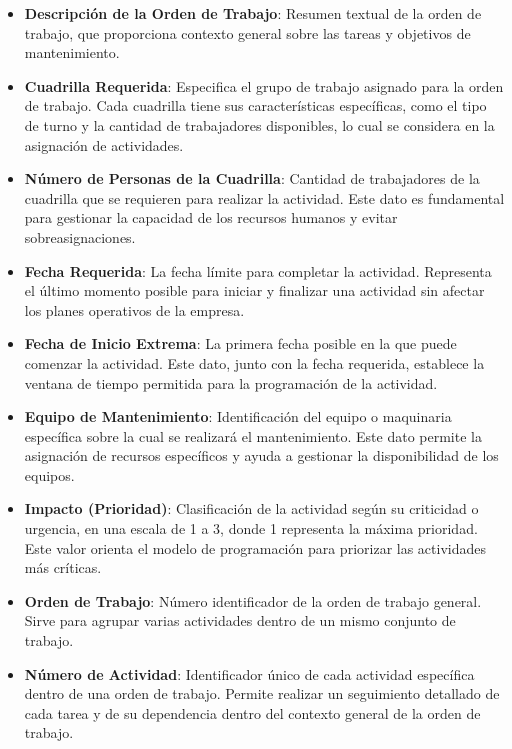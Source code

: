 \documentclass{article}
\begin{document}
\begin{itemize}
    \item \textbf{Descripción de la Orden de Trabajo}: Resumen textual de la orden de trabajo, que proporciona contexto general sobre las tareas y objetivos de mantenimiento.

    \item \textbf{Cuadrilla Requerida}: Especifica el grupo de trabajo asignado para la orden de trabajo. Cada cuadrilla tiene sus características específicas, como el tipo de turno y la cantidad de trabajadores disponibles, lo cual se considera en la asignación de actividades.

    \item \textbf{Número de Personas de la Cuadrilla}: Cantidad de trabajadores de la cuadrilla que se requieren para realizar la actividad. Este dato es fundamental para gestionar la capacidad de los recursos humanos y evitar sobreasignaciones.

    \item \textbf{Fecha Requerida}: La fecha límite para completar la actividad. Representa el último momento posible para iniciar y finalizar una actividad sin afectar los planes operativos de la empresa.

    \item \textbf{Fecha de Inicio Extrema}: La primera fecha posible en la que puede comenzar la actividad. Este dato, junto con la fecha requerida, establece la ventana de tiempo permitida para la programación de la actividad.

    \item \textbf{Equipo de Mantenimiento}: Identificación del equipo o maquinaria específica sobre la cual se realizará el mantenimiento. Este dato permite la asignación de recursos específicos y ayuda a gestionar la disponibilidad de los equipos.

    \item \textbf{Impacto (Prioridad)}: Clasificación de la actividad según su criticidad o urgencia, en una escala de 1 a 3, donde 1 representa la máxima prioridad. Este valor orienta el modelo de programación para priorizar las actividades más críticas.

    \item \textbf{Orden de Trabajo}: Número identificador de la orden de trabajo general. Sirve para agrupar varias actividades dentro de un mismo conjunto de trabajo.

    \item \textbf{Número de Actividad}: Identificador único de cada actividad específica dentro de una orden de trabajo. Permite realizar un seguimiento detallado de cada tarea y de su dependencia dentro del contexto general de la orden de trabajo.


\end{itemize}
\end{document}
